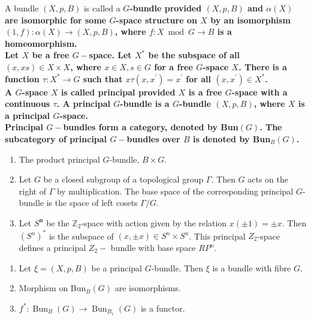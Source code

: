 A bundle $(X, p, B)$ is called a \bf{$G$-bundle} provided $(X, p, B)$ and $\alpha(X)$ are isomorphic for some $G$-space structure on $X$ by an isomorphism $(1, f): \alpha(X) \rightarrow(X, p, B)$, where $f: X \bmod G \rightarrow B$ is a homeomorphism.\\

Let $X$ be a free $G-$space. Let $X^*$ be the subspace of all $(x, x s) \in X \times X$, where $x \in X, s \in G$ for a free $G$-space $X$. There is a function $\tau: X^* \rightarrow G$ such that $x \tau\left(x, x^{\prime}\right)=x^{\prime}$ for all $\left(x, x^{\prime}\right) \in X^*$. \\
A $G$-space $X$ is called \bf{principal} provided $X$ is a free $G$-space with a continuous $\tau$. A \bf{principal $G$-bundle} is a $G$-bundle $(X, p, B)$, where $X$ is a principal $G$-space.\\
Principal $G-$bundles form a category, denoted by Bun$(G)$. The subcategory of principal $G-$bundles over $B$ is denoted by Bun$_B(G)$.

\begin{example}
    \begin{enumerate}
        \item The product principal $G$-bundle, $B\times G$.
        \item Let $G$ be a closed subgroup of a topological group $\Gamma$. Then $G$ acts on the right of $\Gamma$ by multiplication. The base space of the corresponding principal $G$-bundle is the space of left cosets $\Gamma / G$. 
        \item Let $S^{\boldsymbol{n}}$ be the $\mathbb{Z}_2$-space with action given by the relation $x( \pm 1)= \pm x$. Then $\left(S^n\right)^*$ is the subspace of $(x, \pm x) \in S^n \times S^n$. This principal $Z_2$-space defines a principal $Z_{2}-$ bundle with base space $R P^n$.
    \end{enumerate}
\end{example}

\begin{prop}
    \begin{enumerate}
        \item Let $\xi=(X, p, B)$ be a principal $G$-bundle. Then $\xi$ is a bundle with fibre $G$.
        \item Morphism on Bun$_B(G)$ are isomorphisms.
        \item $f^*: \operatorname{Bun}_B(G) \rightarrow \operatorname{Bun}_{B_1}(G)$ is a functor.
    \end{enumerate}

\end{prop}

